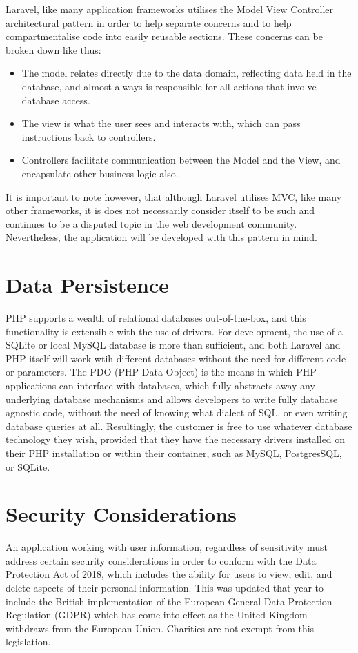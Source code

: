 Laravel, like many application frameworks utilises the Model View Controller architectural pattern in order to help separate concerns and to help compartmentalise code into easily reusable sections. \cite{Ighodaro1} These concerns can be broken down like thus:

\begin{itemize}
    \item The model relates directly due to the data domain, reflecting data held in the database, and almost always is responsible for all actions that involve database access.
    \item The view is what the user sees and interacts with, which can pass instructions back to controllers.
    \item Controllers facilitate communication between the Model and the View, and encapsulate other business logic also. \cite{7892651}
\end{itemize}

It is important to note however, that although Laravel utilises MVC, like many other frameworks, it is does not necessarily consider itself to be such and continues to be a disputed topic in the web development community. \cite{Otwell1} Nevertheless, the application will be developed with this pattern in mind.

\section{Data Persistence}

PHP supports a wealth of relational databases out-of-the-box, and this functionality is extensible with the use of drivers. For development, the use of a SQLite or local MySQL database is more than sufficient, and both Laravel and PHP itself will work wtih different databases without the need for different code or parameters. The PDO (PHP Data Object) is the means in which PHP applications can interface with databases, which fully abstracts away any underlying database mechanisms and allows developers to write fully database agnostic code, without the need of knowing what dialect of SQL, or even writing database queries at all. Resultingly, the customer is free to use whatever database technology they wish, provided that they have the necessary drivers installed on their PHP installation or within their container, such as MySQL, PostgresSQL, or SQLite. \cite{PHP1}

\section{Security Considerations}
An application working with user information, regardless of sensitivity must address certain security considerations in order to conform with the Data Protection Act of 2018, which includes the ability for users to view, edit, and delete aspects of their personal information. This was updated that year to include the British implementation of the European General Data Protection Regulation (GDPR) which has come into effect as the United Kingdom withdraws from the European Union. Charities are not exempt from this legislation. \cite{HMGovt1} \cite{HMGovt2}

